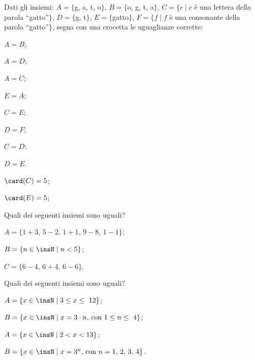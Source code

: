 \begin{esercizio}
\label{ese:6.24}
Dati gli insiemi:
$A=\{$g, a, t, o$\}$, $B=\{$o, g, t, a$\}$, $C=\{c\mid c$ è una lettera della parola ``gatto''$\}$,
$D=\{$g, t$\}$, $E=\{$gatto$\}$, $F=\{f\mid f$ è una consonante della parola ``gatto''$\}$,
segna con una crocetta le uguaglianze corrette:
\begin{multicols}{4}
\begin{enumeratea}
 \item $A = B$;
 \item $A = D$;
 \item $A = C$;
 \item $E = A$;
 \item $C = E$;
 \item $D = F$;
 \item $C = D$:
 \item $D = E$.
 \columnbreak
 \item $\card (C)=5$;
 \item $\card (E)=5$;
\end{enumeratea}
\end{multicols}
\end{esercizio}

\begin{esercizio}
\label{ese:6.25}
Quali dei seguenti insiemi sono uguali?
 \begin{enumeratea}
 \item $A=\{1+3\text{, }5-2\text{, }1+1\text{, }9-8\text{, }1-1\}$;
\item $B=\{n\in\insN\mid n<5\}$;
\item $C=\{6-4\text{, }6+4\text{, }6-6\}$.
 \end{enumeratea}
\end{esercizio}
\begin{esercizio}
\label{ese:6.26}
Quali dei seguenti insiemi sono uguali?
\begin{multicols}{2}
\begin{enumeratea}
\item $A=\{x\in\insN\mid 3\le x\le~12\}$;
\item $B=\{x\in\insN\mid x=3\cdot n\text{, con } 1\le n\le~4\}$;
\item $A=\{x\in\insN\mid 2<x<13\}$;
\item $B=\{x\in\insN\mid x=3^{n}\text{, con }n=\text{1, 2, 3, 4}\}$.
\end{enumeratea}
\end{multicols}
\end{esercizio}
